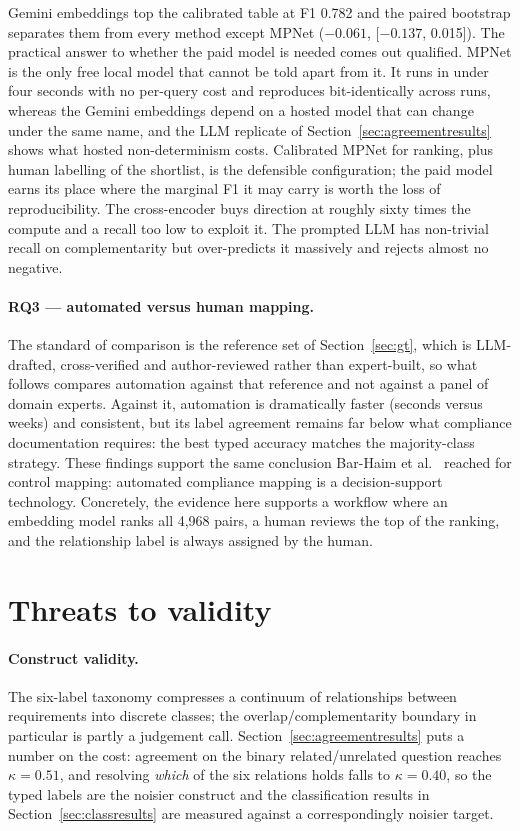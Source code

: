 Gemini embeddings top the calibrated table at F1 0.782 and the paired bootstrap
separates them from every method except MPNet ($-0.061$, [$-0.137$, 0.015]). The
practical answer to whether the paid model is needed comes out qualified.
MPNet is the only free local model that cannot be told apart from it. It runs in
under four seconds with no per-query cost and reproduces bit-identically across
runs, whereas the Gemini embeddings depend on a hosted model that can change
under the same name, and the LLM replicate of
Section~\ref{sec:agreementresults} shows what hosted non-determinism costs.
Calibrated MPNet for ranking, plus human labelling of the shortlist, is the
defensible configuration; the paid model earns its place where the marginal F1 it
may carry is worth the loss of reproducibility. The cross-encoder buys direction
at roughly sixty times the compute and a recall too low to exploit it. The
prompted LLM has non-trivial recall on complementarity but over-predicts it
massively and rejects almost no negative.

\paragraph{RQ3 --- automated versus human mapping.}
The standard of comparison is the reference set of Section~\ref{sec:gt}, which is
LLM-drafted, cross-verified and author-reviewed rather than expert-built, so what
follows compares automation against that reference and not against a panel of
domain experts. Against it, automation is dramatically faster
(seconds versus weeks) and consistent, but its label agreement remains far below
what compliance documentation requires: the best typed accuracy matches the
majority-class strategy. These findings support the same conclusion Bar-Haim et
al.~\cite{barhaim2023cloud} reached for control mapping: automated compliance
mapping is a decision-support technology. Concretely, the evidence here
supports a workflow where an embedding model ranks all 4{,}968 pairs, a
human reviews the top of the ranking, and the relationship label is always
assigned by the human.

\section{Threats to validity}\label{sec:threats}

\paragraph{Construct validity.} The six-label taxonomy compresses a
continuum of relationships between requirements into discrete classes; the
overlap/complementarity boundary in particular is partly a judgement call.
Section~\ref{sec:agreementresults} puts a number on the cost: agreement on the
binary related/unrelated question reaches $\kappa = 0.51$, and resolving
\emph{which} of the six relations holds falls to $\kappa = 0.40$, so the typed
labels are the noisier construct and the classification results in
Section~\ref{sec:classresults} are measured against a correspondingly noisier
target.


